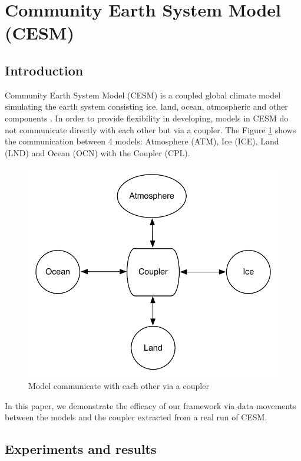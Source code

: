 \section{Community Earth System Model (CESM)}
\label{sec:cesm}

\subsection{Introduction}

Community Earth System Model (CESM) is a coupled global climate model simulating the earth system consisting ice, land, ocean, atmospheric and other components \cite{CESM:Hurrell}. In order to provide flexibility in developing, models in CESM do not communicate directly with each other but via a coupler. The Figure \ref{fig:mct} shows the communication between 4 models: Atmosphere (ATM), Ice (ICE), Land (LND) and Ocean (OCN) with the Coupler (CPL).

\begin{figure}[!htb]
\vspace{-0.15in}
\centering
\includegraphics[scale=0.5]{figures/mct.pdf}
\vspace{-0.15in}
\caption{Model communicate with each other via a coupler}
\vspace{-0.15in}
\label{fig:mct}
\end{figure}

In this paper, we demonstrate the efficacy of our framework via data movements between the models and the coupler extracted from a real run of CESM.

\subsection{Experiments and results}




